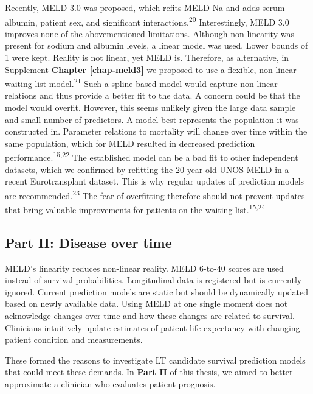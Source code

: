 \documentclass[11pt,english,]{book} %
\begin{document}
Recently, MELD 3.0 was proposed, which refits MELD-Na and adds serum albumin, patient sex, and significant interactions.\textsuperscript{20} Interestingly, MELD 3.0 improves none of the abovementioned limitations. Although non-linearity was present for sodium and albumin levels, a linear model was used. Lower bounds of 1 were kept. Reality is not linear, yet MELD is. Therefore, as alternative, in Supplement \textbf{Chapter \ref{chap-meld3}} we proposed to use a flexible, non-linear waiting list model.\textsuperscript{21} Such a spline-based model would capture non-linear relations and thus provide a better fit to the data. A concern could be that the model would overfit. However, this seems unlikely given the large data sample and small number of predictors. A model best represents the population it was constructed in. Parameter relations to mortality will change over time within the same population, which for MELD resulted in decreased prediction performance.\textsuperscript{15,22} The established model can be a bad fit to other independent datasets, which we confirmed by refitting the 20-year-old UNOS-MELD in a recent Eurotransplant dataset. This is why regular updates of prediction models are recommended.\textsuperscript{23} The fear of overfitting therefore should not prevent updates that bring valuable improvements for patients on the waiting list.\textsuperscript{15,24}

\hypertarget{part-ii-disease-over-time-1}{%
\subsection*{Part II: Disease over time}\label{part-ii-disease-over-time-1}}

MELD's linearity reduces non-linear reality. MELD 6-to-40 scores are used instead of survival probabilities. Longitudinal data is registered but is currently ignored. Current prediction models are static but should be dynamically updated based on newly available data. Using MELD at one single moment does not acknowledge changes over time and how these changes are related to survival. Clinicians intuitively update estimates of patient life-expectancy with changing patient condition and measurements.

These formed the reasons to investigate LT candidate survival prediction models that could meet these demands. In \textbf{Part II} of this thesis, we aimed to better approximate a clinician who evaluates patient prognosis.
\end{document}

